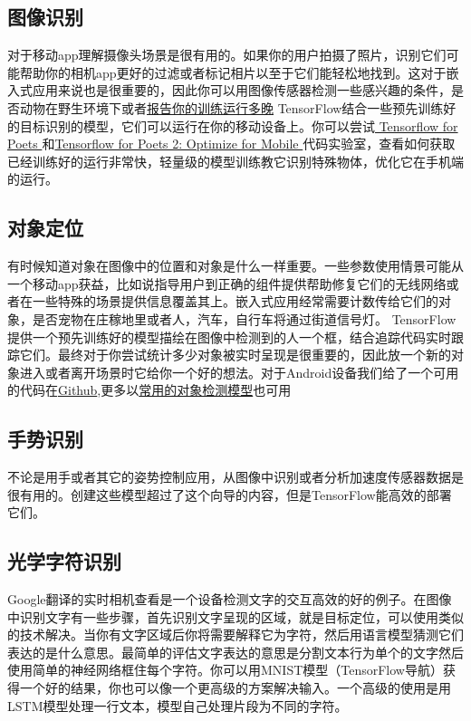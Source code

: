 \subsection{图像识别}
对于移动app理解摄像头场景是很有用的。如果你的用户拍摄了照片，识别它们可能帮助你的相机app更好的过滤或者标记相片以至于它们能轻松地找到。这对于嵌入式应用来说也是很重要的，因此你可以用图像传感器检测一些感兴趣的条件，是否动物在野生环境下或者\href{https://svds.com/tensorflow-image-recognition-raspberry-pi/}{报告你的训练运行多晚}
TensorFlow结合一些预先训练好的目标识别的模型，它们可以运行在你的移动设备上。你可以尝试\href{https://codelabs.developers.google.com/codelabs/tensorflow-for-poets/index.html?hl=zh-cn#0}{ Tensorflow for Poets }和\href{https://codelabs.developers.google.com/codelabs/tensorflow-for-poets-2/index.html?hl=zh-cn#0}{Tensorflow for Poets 2: Optimize for Mobile }代码实验室，查看如何获取已经训练好的运行非常快，轻量级的模型训练教它识别特殊物体，优化它在手机端的运行。
\subsection{对象定位}
有时候知道对象在图像中的位置和对象是什么一样重要。一些参数使用情景可能从一个移动app获益，比如说指导用户到正确的组件提供帮助修复它们的无线网络或者在一些特殊的场景提供信息覆盖其上。嵌入式应用经常需要计数传给它们的对象，是否宠物在庄稼地里或者人，汽车，自行车将通过街道信号灯。
TensorFlow提供一个预先训练好的模型描绘在图像中检测到的人一个框，结合追踪代码实时跟踪它们。最终对于你尝试统计多少对象被实时呈现是很重要的，因此放一个新的对象进入或者离开场景时它给你一个好的想法。对于Android设备我们给了一个可用的代码在\href{https://github.com/tensorflow/tensorflow/tree/master/tensorflow/examples/android}{Github},更多以\href{https://github.com/tensorflow/models/tree/master/object_detection/README.md}{常用的对象检测模型}也可用
\subsection{手势识别}
不论是用手或者其它的姿势控制应用，从图像中识别或者分析加速度传感器数据是很有用的。创建这些模型超过了这个向导的内容，但是TensorFlow能高效的部署它们。
\subsection{光学字符识别}
Google翻译的实时相机查看是一个设备检测文字的交互高效的好的例子。在图像中识别文字有一些步骤，首先识别文字呈现的区域，就是目标定位，可以使用类似的技术解决。当你有文字区域后你将需要解释它为字符，然后用语言模型猜测它们表达的是什么意思。最简单的评估文字表达的意思是分割文本行为单个的文字然后使用简单的神经网络框住每个字符。你可以用MNIST模型（TensorFlow导航）获得一个好的结果，你也可以像一个更高级的方案解决输入。一个高级的使用是用LSTM模型处理一行文本，模型自己处理片段为不同的字符。
